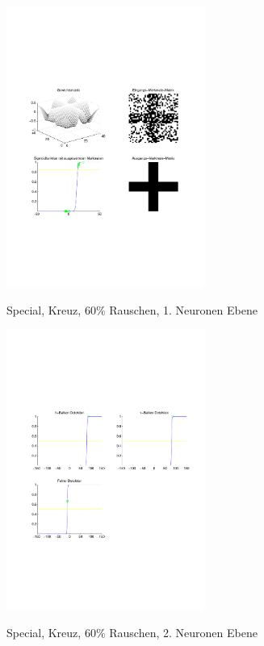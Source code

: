 \begin{figure}[hbt]
	\begin{minipage}[c]{\textwidth}
		\centering
       	\includegraphics[trim=71 213 43 212, clip, width=0.58\textwidth]{./Bilder/Auswertung/Endergebnis/TypeSpecial_Rauschen60_Cross_Layer1}
		\caption{Special, Kreuz, 60\% Rauschen, 1. Neuronen Ebene}
		\label{Special_Kreuz_60_1}
		\vfill
		\includegraphics[trim=71 213 43 212, clip, width=0.58\textwidth]{./Bilder/Auswertung/Endergebnis/TypeSpecial_Rauschen60_Cross_Layer2}
		\caption{Special, Kreuz, 60\% Rauschen, 2. Neuronen Ebene}
		\label{Special_Kreuz_60_2}
	\end{minipage}
\end{figure}

